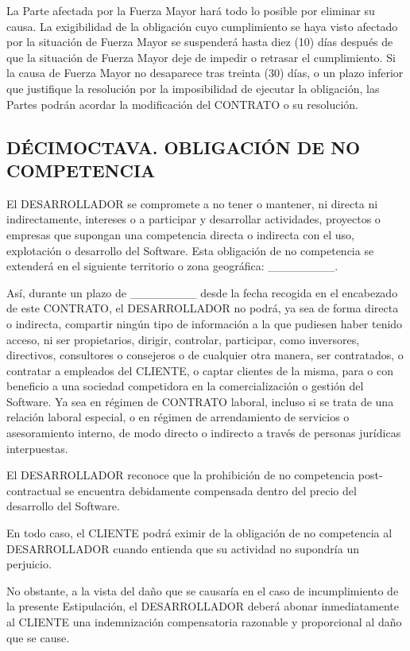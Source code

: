 \documentclass[a4paper,11pt]{report}
\begin{document}
	La Parte afectada por la Fuerza Mayor hará todo lo posible por eliminar
	su causa. La exigibilidad de la obligación cuyo cumplimiento se haya
	visto afectado por la situación de Fuerza Mayor se suspenderá hasta diez
	(10) días después de que la situación de Fuerza Mayor deje de impedir o
	retrasar el cumplimiento. Si la causa de Fuerza Mayor no desaparece tras
	treinta (30) días, o un plazo inferior que justifique la resolución por
	la imposibilidad de ejecutar la obligación, las Partes podrán acordar la
	modificación del CONTRATO o su resolución.

	\subsection*{DÉCIMOCTAVA. OBLIGACIÓN DE NO COMPETENCIA}

	El DESARROLLADOR se compromete a no tener o mantener, ni directa ni
	indirectamente, intereses o a participar y desarrollar actividades,
	proyectos o empresas que supongan una competencia directa o indirecta
	con el uso, explotación o desarrollo del Software. Esta obligación de no
	competencia se extenderá en el siguiente territorio o zona geográfica:
	\_\_\_\_\_\_\_\_.

	Así, durante un plazo de \_\_\_\_\_\_\_\_ desde la fecha recogida en el
	encabezado de este CONTRATO, el DESARROLLADOR no podrá, ya sea de forma
	directa o indirecta, compartir ningún tipo de información a la que
	pudiesen haber tenido acceso, ni ser propietarios, dirigir, controlar,
	participar, como inversores, directivos, consultores o consejeros o de
	cualquier otra manera, ser contratados, o contratar a empleados del
	CLIENTE, o captar clientes de la misma, para o con beneficio a una
	sociedad competidora en la comercialización o gestión del Software. Ya
	sea en régimen de CONTRATO laboral, incluso si se trata de una relación
	laboral especial, o en régimen de arrendamiento de servicios o
	asesoramiento interno, de modo directo o indirecto a través de personas
	jurídicas interpuestas.

	El DESARROLLADOR reconoce que la prohibición de no competencia
	post-contractual se encuentra debidamente compensada dentro del precio
	del desarrollo del Software.

	En todo caso, el CLIENTE podrá eximir de la obligación de no competencia
	al DESARROLLADOR cuando entienda que su actividad no supondría un
	perjuicio.

	No obstante, a la vista del daño que se causaría en el caso de
	incumplimiento de la presente Estipulación, el DESARROLLADOR deberá
	abonar inmediatamente al CLIENTE una indemnización compensatoria
	razonable y proporcional al daño que se cause.
\end{document}

